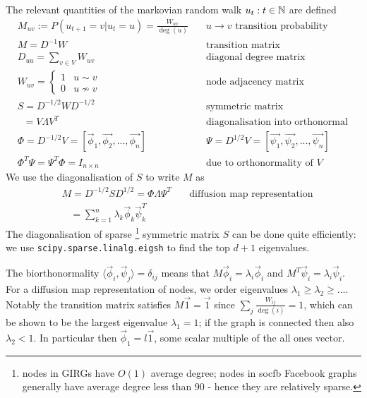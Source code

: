 The relevant quantities of the markovian random walk $u_t : t \in \mathbb{N}$ are defined
\begin{align*}
  & M_{uv} := P(u_{t+1} = v | u_t=u) = \frac{W_{uv}}{\deg(u)}
  \quad & \text{$u \to v$ transition probability}
  \\
  & M = D^{-1}W \quad & \text{transition matrix}\\
  & D_{uu} = \sum_{v\in V} W_{uv} \quad & \text{diagonal degree matrix}\\
  & W_{uv} = \begin{cases}1 & u \sim v \\0 & u \nsim v \end{cases} \quad & \text{node adjacency matrix}
  \\
  & S = D^{-1/2} W D^{-1/2} \quad & \text{symmetric matrix}\\
  & \;\; = V \Lambda V^T \quad & \text{diagonalisation into orthonormal e-vectors}\\
  & \Phi = D^{-1/2} V = [\vec{\phi}_1, \vec{\phi_2}, ..., \vec{\phi_n}] \quad & \Psi = D^{1/2} V = [\vec{\psi_1}, \vec{\psi_2}, ..., \vec{\psi_n}]\\
  & \Phi^T \Psi = \Psi^T \Phi = I_{n \times n} \quad & \text{due to orthonormality of $V$}
\end{align*}
%
We use the diagonalisation of $S$ to write $M$ as 
\begin{align*}
  & M = D^{-1/2} S D^{1/2} = \Phi \Lambda \Psi^T \quad & \text{diffusion map representation}\\
  & \;\;\; = \sum_{k=1}^n \lambda_k \vec{\phi}_k \vec{\psi}_k^T &
\end{align*}
%
The diagonalisation of sparse
\footnote{nodes in GIRGs have $O(1)$ average degree; nodes in socfb Facebook graphs generally have average degree less than $90$ - hence they are relatively sparse.}
symmetric matrix $S$ can be done quite efficiently: 
we use \verb+scipy.sparse.linalg.eigsh+ to find the top $d+1$ eigenvalues.

The biorthonormality $\langle \vec{\phi}_i, \vec{\psi}_j \rangle = \delta_{ij}$ means that $M \vec{\phi}_i = \lambda_i \vec{\phi}_i$ and $M^T \vec{\psi}_i = \lambda_i \vec{\psi}_i$. For a diffusion map representation of nodes, we order eigenvalues $\lambda_1 \geq \lambda_2 \geq ...$.
Notably the transition matrix satisfies $M\vec{1} = \vec{1}$ since $\sum_j \frac{W_{ij}}{\deg(i)} = 1$, which can be shown to be the largest eigenvalue $\lambda_1=1$; if the graph is connected then also $\lambda_2 < 1$. In particular then $\vec{\phi}_1 = l \vec{1}$, some scalar multiple of the all ones vector.

